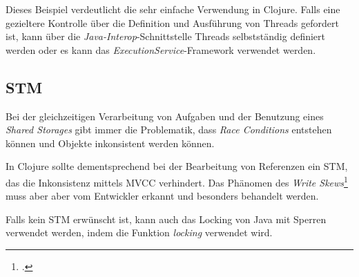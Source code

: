 Dieses Beispiel verdeutlicht die sehr einfache Verwendung in Clojure. Falls eine gezieltere Kontrolle über die Definition und Ausführung von Threads gefordert ist, kann über die \textit{Java-Interop}-Schnittstelle Threads selbstständig definiert werden oder es kann das \textit{ExecutionService}-Framework verwendet werden.

\subsection*{\acl{STM}}
Bei der gleichzeitigen Verarbeitung von Aufgaben und der Benutzung eines \textit{Shared Storages} gibt immer die Problematik, dass \textit{Race Conditions} entstehen können und Objekte inkonsistent werden können.

In Clojure sollte dementsprechend bei der Bearbeitung von Referenzen ein \acf{STM}, das die Inkonsistenz mittels \ac{MVCC} verhindert. Das Phänomen des \textit{Write Skews}\footcite[S. Seite 17]{RENZSTATE} muss aber aber vom Entwickler erkannt und besonders behandelt werden.

Falls kein \ac{STM} erwünscht ist, kann auch das Locking von Java mit Sperren verwendet werden, indem die Funktion \textit{locking} verwendet wird.
